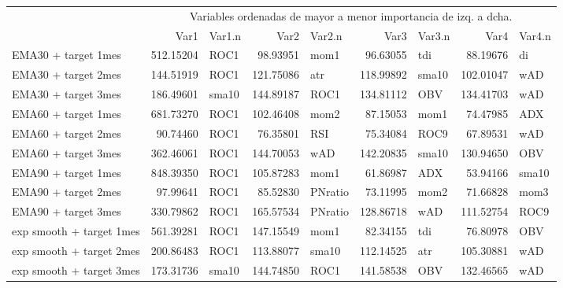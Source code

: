 \documentclass[]{DissertateUSU}
\begin{document}
\begin{table}[H]
\centering\begingroup\fontsize{10}{12}\selectfont

\begin{tabular}{l|r|l|r|l|r|l|r|l}
\hline
\multicolumn{1}{c|}{ } & \multicolumn{8}{c}{Variables ordenadas de mayor a menor importancia de izq. a dcha.} \\
\cline{2-9}
  & Var1 & Var1.n & Var2 & Var2.n & Var3 & Var3.n & Var4 & Var4.n\\
\hline
EMA30 + target 1mes & 512.15204 & ROC1 & 98.93951 & mom1 & 96.63055 & tdi & 88.19676 & di\\
\hline
EMA30 + target 2mes & 144.51919 & ROC1 & 121.75086 & atr & 118.99892 & sma10 & 102.01047 & wAD\\
\hline
EMA30 + target 3mes & 186.49601 & sma10 & 144.89187 & ROC1 & 134.81112 & OBV & 134.41703 & wAD\\
\hline
EMA60 + target 1mes & 681.73270 & ROC1 & 102.46408 & mom2 & 87.15053 & mom1 & 74.47985 & ADX\\
\hline
EMA60 + target 2mes & 90.74460 & ROC1 & 76.35801 & RSI & 75.34084 & ROC9 & 67.89531 & wAD\\
\hline
EMA60 + target 3mes & 362.46061 & ROC1 & 144.70053 & wAD & 142.20835 & sma10 & 130.94650 & OBV\\
\hline
EMA90 + target 1mes & 848.39350 & ROC1 & 105.87283 & mom1 & 61.86987 & ADX & 53.94166 & sma10\\
\hline
EMA90 + target 2mes & 97.99641 & ROC1 & 85.52830 & PNratio & 73.11995 & mom2 & 71.66828 & mom3\\
\hline
EMA90 + target 3mes & 330.79862 & ROC1 & 165.57534 & PNratio & 128.86718 & wAD & 111.52754 & ROC9\\
\hline
exp smooth + target 1mes & 561.39281 & ROC1 & 147.15549 & mom1 & 82.34155 & tdi & 76.80978 & OBV\\
\hline
exp smooth + target 2mes & 200.86483 & ROC1 & 113.88077 & sma10 & 112.14525 & atr & 105.30881 & wAD\\
\hline
exp smooth + target 3mes & 173.31736 & sma10 & 144.74850 & ROC1 & 141.58538 & OBV & 132.46565 & wAD\\
\hline
\end{tabular}
\endgroup{}
\end{table}

\setlength\parskip{5ex}
\end{document}
